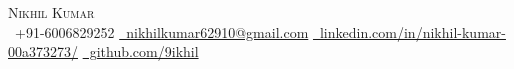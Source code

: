 {\Huge \scshape Nikhil Kumar} \\ \vspace{4pt}
\small
\faPhone\ +91-6006829252 \quad
\href{mailto:nikhilkumar62910@gmail.com}{\faEnvelope\ nikhilkumar62910@gmail.com} \quad
\href{https://linkedin.com/in/nikhil-kumar-00a373273/}{\faLinkedin\ linkedin.com/in/nikhil-kumar-00a373273/} \quad
\href{https://github.com/9ikhil}{\faGithub\ github.com/9ikhil}
